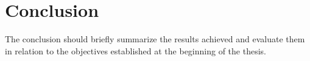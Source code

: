 \section*{Conclusion}


The conclusion should briefly summarize the results achieved and evaluate them in relation to the objectives established at the beginning of the thesis.

\label{text-end}